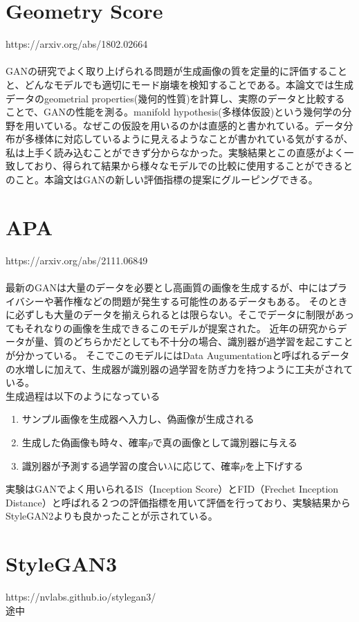 \documentclass[dvipdfmx]{jsarticle}
\begin{document}
\section{Geometry Score}
\parindent=0pt https://arxiv.org/abs/1802.02664
\\\\
GANの研究でよく取り上げられる問題が生成画像の質を定量的に評価することと、どんなモデルでも適切にモード崩壊を検知することである。本論文では生成データのgeometrial properties(幾何的性質)を計算し、実際のデータと比較することで、GANの性能を測る。manifold hypothesis(多様体仮設)という幾何学の分野を用いている。なぜこの仮設を用いるのかは直感的と書かれている。データ分布が多様体に対応しているように見えるようなことが書かれている気がするが、私は上手く読み込むことができず分からなかった。実験結果とこの直感がよく一致しており、得られて結果から様々なモデルでの比較に使用することができるとのこと。本論文はGANの新しい評価指標の提案にグルーピングできる。
\
\section{APA}
\parindent=0pt https://arxiv.org/abs/2111.06849
\\\\
最新のGANは大量のデータを必要とし高画質の画像を生成するが、中にはプライバシーや著作権などの問題が発生する可能性のあるデータもある。
そのときに必ずしも大量のデータを揃えられるとは限らない。そこでデータに制限があってもそれなりの画像を生成できるこのモデルが提案された。
近年の研究からデータが量、質のどちらかだとしても不十分の場合、識別器が過学習を起こすことが分かっている。
そこでこのモデルにはData Augumentationと呼ばれるデータの水増しに加えて、生成器が識別器の過学習を防ぎ力を持つように工夫がされている。\\
生成過程は以下のようになっている
\begin{enumerate}
  \item サンプル画像を生成器へ入力し、偽画像が生成される
  \item 生成した偽画像も時々、確率$p$で真の画像として識別器に与える
  \item 識別器が予測する過学習の度合い$\lambda$に応じて、確率$p$を上下げする
\end{enumerate}


\parindent=0pt 実験はGANでよく用いられるIS（Inception Score）とFID（Frechet Inception Distance）と呼ばれる２つの評価指標を用いて評価を行っており、実験結果からStyleGAN2よりも良かったことが示されている。


\section{StyleGAN3}
\parindent=0pt https://nvlabs.github.io/stylegan3/
\\途中
\end{document}
